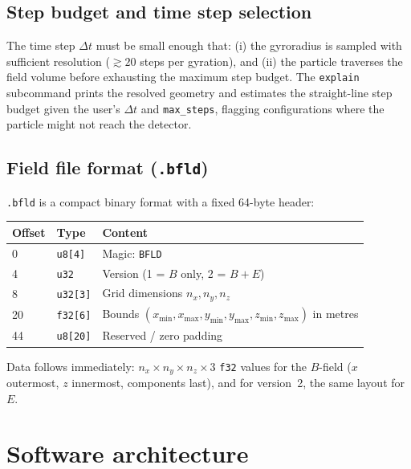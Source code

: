 \documentclass[review,12pt]{elsarticle}
\begin{document}
\subsection{Step budget and time step selection}

The time step $\Delta t$ must be small enough that: (i) the gyroradius is sampled with
sufficient resolution ($\gtrsim 20$ steps per gyration), and (ii) the particle traverses
the field volume before exhausting the maximum step budget. The \texttt{explain} subcommand
prints the resolved geometry and estimates the straight-line step budget given the
user's $\Delta t$ and \texttt{max\_steps}, flagging configurations where the particle
might not reach the detector.

\subsection{Field file format (\texttt{.bfld})}
\label{sec:bfld}

\texttt{.bfld} is a compact binary format with a fixed 64-byte header:

\begin{center}
\begin{tabular}{lll}
\toprule
Offset & Type & Content \\
\midrule
0 & \texttt{u8[4]} & Magic: \texttt{BFLD} \\
4 & \texttt{u32} & Version (1 = $B$ only, 2 = $B+E$) \\
8 & \texttt{u32[3]} & Grid dimensions $n_x, n_y, n_z$ \\
20 & \texttt{f32[6]} & Bounds $(x_\mathrm{min}, x_\mathrm{max}, y_\mathrm{min}, y_\mathrm{max}, z_\mathrm{min}, z_\mathrm{max})$ in metres \\
44 & \texttt{u8[20]} & Reserved / zero padding \\
\bottomrule
\end{tabular}
\end{center}

Data follows immediately: $n_x \times n_y \times n_z \times 3$ \texttt{f32} values
for the $B$-field ($x$ outermost, $z$ innermost, components last), and for version~2,
the same layout for $E$.

\section{Software architecture}
\label{sec:software}
\end{document}
